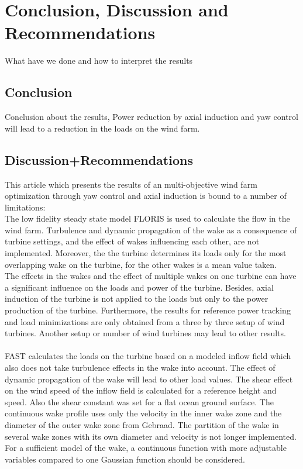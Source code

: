 \section{Conclusion, Discussion and Recommendations}
What have we done and how to interpret the results
\subsection{Conclusion}
Conclusion about the results, Power reduction by axial  induction and yaw control will lead to a reduction in the loads on the wind farm. 
 

\subsection{Discussion+Recommendations}
This article which presents the results of an multi-objective wind farm optimization through yaw control and axial induction is bound to a number of limitations:
\newline
\\
The low fidelity steady state model FLORIS is used to calculate the flow in the wind farm. Turbulence and dynamic propagation of the wake as a consequence of turbine settings, and the effect of wakes influencing each other, are not implemented. Moreover, the the turbine determines its loads only for the most overlapping wake on the turbine, for the other wakes is a mean value taken. \\The effects in the wakes and the effect of multiple wakes on one turbine can have a significant influence on the loads and power of the turbine. Besides, axial induction of the turbine is not applied to the loads but only to the power production of the turbine. 
Furthermore, the results for reference power tracking and load minimizations are only obtained from a three by three setup of wind turbines. Another setup or number of wind turbines may lead to other results. 
\\\\
FAST calculates the loads on the turbine based on a modeled inflow field which also does not take turbulence effects in the wake into account. The effect of dynamic propagation of the wake will lead to other load values. The shear effect on the wind speed of the inflow field is calculated for a reference height and  speed. Also the shear constant was set for a flat ocean ground surface.
\newline 
The continuous wake profile uses only the velocity in the inner wake zone and the diameter of the outer wake zone from Gebraad. \cite{Gebraad2016} The partition of the wake in several wake zones with its own diameter and velocity is not longer implemented. For a sufficient model of the wake, a continuous function with more adjustable variables compared to one Gaussian function should be considered.  
